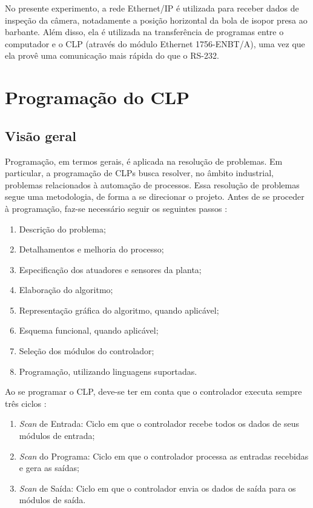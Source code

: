 No presente experimento, a rede Ethernet/IP é utilizada para receber dados de inspeção da câmera, notadamente a posição horizontal da bola de isopor presa ao barbante. Além disso, ela é utilizada na transferência de programas entre o computador e o CLP (através do módulo Ethernet 1756-ENBT/A), uma vez que ela provê uma comunicação mais rápida do que o RS-232.

\begin{comment}
https://en.wikipedia.org/wiki/Industrial_Ethernet
https://en.wikipedia.org/wiki/EtherNet/IP
https://www.odva.org/Technology-Standards/EtherNet-IP/Overview
http://www.rtaautomation.com/technologies/ethernetip/
http://www.rockwellautomation.com/global/products-technologies/integrated-architecture/ethernet-ip.page
http://www.rtaautomation.com/technologies/ethernetip/
\end{comment}

\section{Programação do CLP}
\subsection{Visão geral}
Programação, em termos gerais, é aplicada na resolução de problemas. Em particular, a programação de CLPs busca resolver, no âmbito industrial, problemas relacionados à automação de processos. Essa resolução de problemas segue uma metodologia, de forma a se direcionar o projeto. Antes de se proceder à programação, faz-se necessário seguir os seguintes passos \cite{rockwellAutomation}:
\begin{enumerate}
  \item Descrição do problema;
  \item Detalhamentos e melhoria do processo;
  \item Especificação dos atuadores e sensores da planta;
  \item Elaboração do algoritmo;
  \item Representação gráfica do algoritmo, quando aplicável;
  \item Esquema funcional, quando aplicável;
  \item Seleção dos módulos do controlador;
  \item Programação, utilizando linguagens suportadas.
\end{enumerate}

Ao se programar o CLP, deve-se ter em conta que o controlador executa sempre três ciclos \cite{rockwellAutomation}:
\begin{enumerate}
  \item \textit{Scan} de Entrada: Ciclo em que o controlador recebe todos os dados de seus módulos de entrada;
  \item \textit{Scan} do Programa: Ciclo em que o controlador processa as entradas recebidas e gera as saídas;
  \item \textit{Scan} de Saída: Ciclo em que o controlador envia os dados de saída para os módulos de saída.
\end{enumerate}

